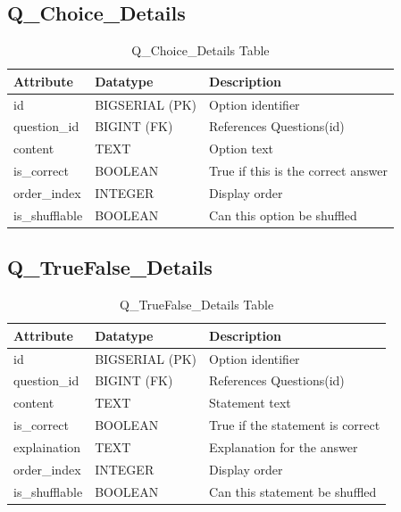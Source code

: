 \documentclass[../report_main.tex]{subfiles}
\begin{document}
\subsection{Q\_Choice\_Details}
\begin{table}[H]
\centering
\caption{Q\_Choice\_Details Table}
\label{tab:q_choice_details}
\renewcommand{\arraystretch}{1.25}
\begin{tabular}{|p{3cm}|p{3.5cm}|p{8.5cm}|}
\hline
\textbf{Attribute} & \textbf{Datatype} & \textbf{Description} \\ \hline
id & BIGSERIAL (PK) & Option identifier \\ \hline
question\_id & BIGINT (FK) & References Questions(id) \\ \hline
content & TEXT & Option text \\ \hline
is\_correct & BOOLEAN & True if this is the correct answer \\ \hline
order\_index & INTEGER & Display order \\ \hline
is\_shufflable & BOOLEAN & Can this option be shuffled \\ \hline
\end{tabular}
\end{table}

\subsection{Q\_TrueFalse\_Details}
\begin{table}[H]
\centering
\caption{Q\_TrueFalse\_Details Table}
\label{tab:q_truefalse_details}
\renewcommand{\arraystretch}{1.25}
\begin{tabular}{|p{3cm}|p{3.5cm}|p{8.5cm}|}
\hline
\textbf{Attribute} & \textbf{Datatype} & \textbf{Description} \\ \hline
id & BIGSERIAL (PK) & Option identifier \\ \hline
question\_id & BIGINT (FK) & References Questions(id) \\ \hline
content & TEXT & Statement text \\ \hline
is\_correct & BOOLEAN & True if the statement is correct \\ \hline
explaination & TEXT & Explanation for the answer \\ \hline
order\_index & INTEGER & Display order \\ \hline
is\_shufflable & BOOLEAN & Can this statement be shuffled \\ \hline
\end{tabular}
\end{table}
\end{document}
